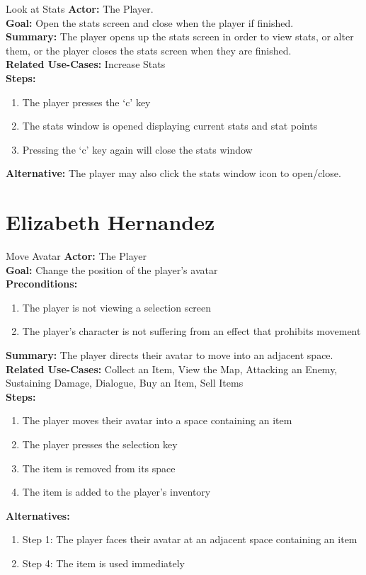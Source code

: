 \documentclass[12pt]{report}
\begin{document}
\begin{subsection}{Look at Stats}
\textbf{Actor:} The Player. \\
\textbf{Goal:} Open the stats screen and close when the player if finished. \\
\textbf{Summary:} The player opens up the stats screen in order to view stats, or alter them, or the player closes the stats screen when they are finished. \\
\textbf{Related Use-Cases:} Increase Stats \\
\textbf{Steps:}
\begin{enumerate}
	\item The player presses the ‘c’ key
	\item The stats window is opened displaying current stats and stat points
	\item Pressing the ‘c’ key again will close the stats window
\end{enumerate}
\textbf{Alternative:} The player may also click the stats window icon to open/close.
\end{subsection}





\section{Elizabeth Hernandez}
\begin{subsection}{Move Avatar}
\textbf{Actor:} The Player \\
\textbf{Goal:} Change the position of the player's avatar \\
\textbf{Preconditions:} 
\begin{enumerate}
	\item The player is not viewing a selection screen
	\item The player's character is not suffering from an effect that prohibits movement
\end{enumerate}
\textbf{Summary:} The player directs their avatar to move into an adjacent space. \\
\textbf{Related Use-Cases:} Collect an Item, View the Map, Attacking an Enemy, Sustaining Damage, Dialogue, Buy an Item, Sell Items \\
\textbf{Steps:}
\begin{enumerate}
	\item The player moves their avatar into a space containing an item
	\item The player presses the selection key
	\item The item is removed from its space
	\item The item is added to the player's inventory
\end{enumerate}
\textbf{Alternatives:} 
\begin{enumerate}
	\item Step 1: The player faces their avatar at an adjacent space containing an item
	\item Step 4: The item is used immediately
\end{enumerate}
\end{subsection}
\end{document}
